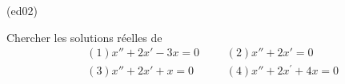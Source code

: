 \begin{tiny}(ed02)\end{tiny} 
Chercher les solutions r{\'e}elles de
\begin{align*}
&(1) x''+2x'-3x = 0 & &
&(2) x''+2x' = 0 \\
&(3)x''+2x'+x = 0 & &
&(4)x''+2x^{\prime }+4x = 0
\end{align*}